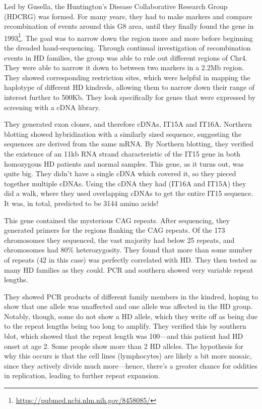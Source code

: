 Led by Gusella, the Huntington's Disease Collaborative Research Group (HDCRG) was formed. For many years, they had to make markers and compare recombination of events around this G8 area, until they finally found the gene in 1993\footnote{\url{https://pubmed.ncbi.nlm.nih.gov/8458085/}}. The goal was to narrow down the region more and more before beginning the dreaded hand-sequencing. Through continual investigation of recombination events in HD families, the group was able to rule out different regions of Chr4. They were able to narrow it down to between two markers in a  2.2Mb region. They showed corresponding restriction sites, which were helpful in mapping the haplotype of different HD kindreds, allowing them to narrow down their range of interest further to 500Kb. They look specifically for genes that were expressed by screening with a cDNA library. \newline

They generated exon clones, and therefore cDNAs, IT15A and IT16A. Northern blotting showed hybridization with a similarly sized sequence, suggesting the sequences are derived from the same mRNA. By Northern blotting, they verified the existence of an 11kb RNA strand characteristic of the IT15 gene in both homozygous HD patients and normal samples. This gene, as it turns out, was quite big. They didn't have a single cDNA which covered it, so they pieced together multiple cDNAs. Using the cDNA they had (IT16A and IT15A) they did a walk, where they used overlapping cDNAs to get the entire IT15 sequence. It was, in total, predicted to be 3144 amino acids!\newline

This gene contained the mysterious CAG repeats. After sequencing, they generated primers for the regions flanking the CAG repeats. Of the 173 chromosomes they sequenced, the vast majority had below 25 repeats, and chromosomes had 80\% heterozygosity. They found that more than some number of repeats (42 in this case) was perfectly correlated with HD. They then tested as many HD families as they could. PCR and southern showed very variable repeat lengths. \newline

They showed PCR products of different family members in the kindred, hoping to show that one allele was unaffected and one allele was affected in the HD group. Notably, though, some do not show a HD allele, which they write off as being due to the repeat lengths being too long to amplify. They verified this by southern blot, which showed that the repeat length was 100---and this patient had HD onset at age 2. Some people show more than 2 HD alleles. The hypothesis for why this occurs is that the cell lines (lymphocytes) are likely a bit more mosaic, since they actively divide much more---hence, there's a greater chance for oddities in replication, leading to further repeat expansion.\newline

